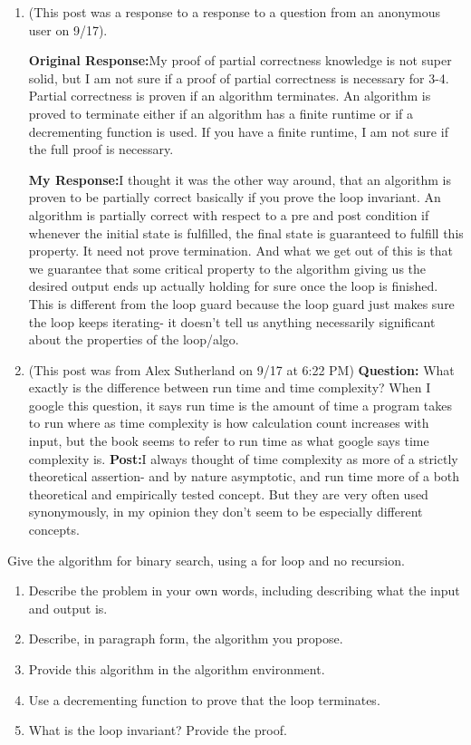 \documentclass{article}
\begin{document}
\begin{enumerate}
    \item (This post was a response to a response to a question from an anonymous user on 9/17).
	    
	    \textbf{Original Response:}My proof of partial correctness knowledge is not super solid, but I am not sure if a 
		proof of partial correctness is necessary for 3-4. Partial correctness is proven if an algorithm 
		terminates. An algorithm is proved to terminate either if an algorithm has a finite runtime or if a decrementing 
		function is used. If you have a finite runtime, I am not sure if the full proof is necessary. 
	  
	    \textbf{My Response:}I thought it was the other way around, 
	    that an algorithm is proven to be partially correct basically if you 
	    prove the loop invariant. An 
	    algorithm is partially correct with respect to a pre and post condition if whenever the initial state is fulfilled, the final state 
	    is guaranteed to fulfill this property. It need not prove termination. And what we get out of this is that we guarantee that 
	    some critical property to the algorithm giving us the desired output ends up actually holding for sure once the loop is 
	    finished. This is different from the loop guard because the loop guard just makes sure the 
	    loop keeps iterating- it doesn't tell us anything necessarily significant about the properties of the loop/algo.
\item (This post was from  Alex Sutherland on 9/17 at 6:22 PM) \textbf{Question:}
	What exactly is the difference between run time and time complexity? When I google this question, 
		it says run time is the amount of time a program takes to run where as time complexity is 
		how calculation count increases with input, but the book seems to refer to 
		run time as what google says time complexity is.
	\textbf{Post:}I always thought of time complexity as 
	    more of a strictly theoretical assertion- and by nature asymptotic, and run 
		time more of a both theoretical and empirically tested concept. But 
		they are very often used synonymously, in my opinion they don't 
		seem to be especially different concepts.
\end{enumerate}


\nextprob
{}

Give the algorithm for binary search, using a for loop and no recursion.

\begin{enumerate}
    \item Describe the problem in your own words, including
        describing what the input and output is.
    \item Describe, in paragraph form, the algorithm you propose.
    \item Provide this algorithm in the algorithm environment.
    \item Use a decrementing function to prove that the loop terminates.
    \item What is the loop invariant? Provide the proof.
\end{enumerate}
\end{document}
